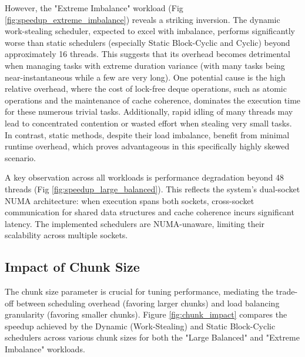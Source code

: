 \documentclass[10pt]{article}
\begin{document}
However, the "Extreme Imbalance" workload (Fig \ref{fig:speedup_extreme_imbalance}) reveals a striking inversion. The dynamic work-stealing scheduler, expected to excel with imbalance, performs significantly worse than static schedulers (especially Static Block-Cyclic and Cyclic) beyond approximately 16 threads. This suggests that its overhead becomes detrimental when managing tasks with extreme duration variance (with many tasks being near-instantaneous while a few are very long). One potential cause is the high relative overhead, where the cost of lock-free deque operations, such as atomic operations and the maintenance of cache coherence, dominates the execution time for these numerous trivial tasks. Additionally, rapid idling of many threads may lead to concentrated contention or wasted effort when stealing very small tasks. In contrast, static methods, despite their load imbalance, benefit from minimal runtime overhead, which proves advantageous in this specifically highly skewed scenario.

A key observation across all workloads is performance degradation beyond 48 threads (Fig \ref{fig:speedup_large_balanced}). This reflects the system's dual-socket NUMA architecture: when execution spans both sockets, cross-socket communication for shared data structures and cache coherence incurs significant latency. The implemented schedulers are NUMA-unaware, limiting their scalability across multiple sockets.

\subsection{Impact of Chunk Size}
The chunk size parameter is crucial for tuning performance, mediating the trade-off between scheduling overhead (favoring larger chunks) and load balancing granularity (favoring smaller chunks). Figure \ref{fig:chunk_impact} compares the speedup achieved by the Dynamic (Work-Stealing) and Static Block-Cyclic schedulers across various chunk sizes for both the "Large Balanced" and "Extreme Imbalance" workloads.
\end{document}
